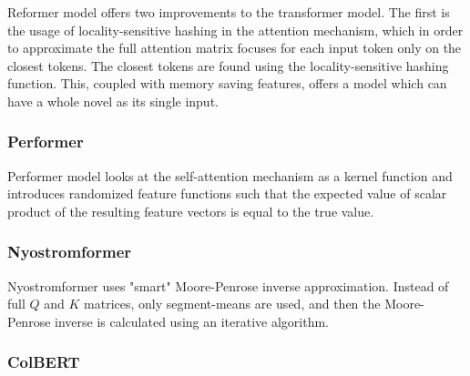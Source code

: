 Reformer model \citep{reformer} offers two improvements to the transformer model.
The first is the usage of locality-sensitive hashing in the attention mechanism, which in order to approximate the full attention matrix focuses for each input token only on the closest tokens.
The closest tokens are found using the locality-sensitive hashing function.
This, coupled with memory saving features, offers a model which can have a whole novel as its single input.

\subsubsection{Performer}

Performer model \citep{performer} looks at the self-attention mechanism as a kernel function and introduces randomized feature functions such that the expected value of scalar product %
of the resulting feature vectors is equal to the true value.

\subsubsection{Nyostromformer}

Nyostromformer \citep{nystrom} uses "smart" Moore-Penrose inverse approximation. Instead of full $Q$ and $K$ matrices, only segment-means are used, and then the Moore-Penrose inverse is calculated using an iterative algorithm.

\subsubsection{ColBERT}


